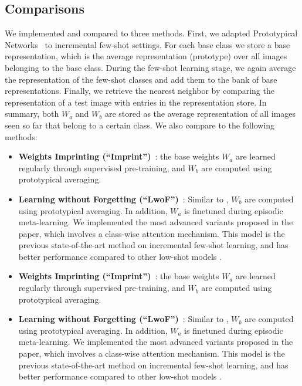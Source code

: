 \subsection{Comparisons}
We implemented and compared to three methods. First, we adapted Prototypical Networks~\citep{proto}
to incremental few-shot settings.  For each base class we store a base representation, which is the
average representation (prototype) over all images belonging to the base class. During the few-shot
learning stage, we again average the representation of the few-shot classes and add them to the bank
of base representations. Finally, we retrieve the nearest neighbor by comparing the representation
of a test image with entries in the representation store. In summary, both $W_a$ and $W_b$ are
stored as the average representation of all images seen so far that belong to a certain class. We
also compare to the following methods:
\iflatexml
\begin{itemize}
    \item \textbf{Weights Imprinting (``Imprint'')}~\citep{qi2018imprinting}: the base weights $W_a$
are learned regularly through supervised pre-training, and $W_b$ are computed using prototypical
averaging.
    \item \textbf{Learning without Forgetting (``LwoF'')}~\citep{lwof}: Similar to
\citep{qi2018imprinting}, $W_b$ are computed using prototypical averaging. In addition, $W_a$ is
finetuned during episodic meta-learning. We implemented the most advanced variants proposed in the
paper, which involves a class-wise attention mechanism. This model is the previous state-of-the-art
method on incremental few-shot learning, and has better performance compared to other low-shot models
\citep{wang2018lowshot,hariharan2017lowshot}.
\end{itemize}
\else
\begin{itemize}[leftmargin=*]
    \item \textbf{Weights Imprinting (``Imprint'')}~\citep{qi2018imprinting}: the base weights $W_a$
are learned regularly through supervised pre-training, and $W_b$ are computed using prototypical
averaging.
    \item \textbf{Learning without Forgetting (``LwoF'')}~\citep{lwof}: Similar to
\citep{qi2018imprinting}, $W_b$ are computed using prototypical averaging. In addition, $W_a$ is
finetuned during episodic meta-learning. We implemented the most advanced variants proposed in the
paper, which involves a class-wise attention mechanism. This model is the previous state-of-the-art
method on incremental few-shot learning, and has better performance compared to other low-shot models
\citep{wang2018lowshot,hariharan2017lowshot}.
\end{itemize}
\fi
